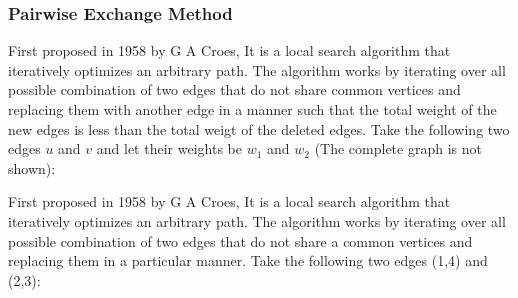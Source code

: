 \documentclass[11pt]{article}
\begin{document}
    \subsubsection {Pairwise Exchange Method}

     First proposed in 1958 by G A Croes, It is a local search algorithm that iteratively optimizes an arbitrary path. The algorithm works by iterating over all possible combination of two edges that do not share common vertices and replacing them with another edge in a manner such that the total weight of the new edges is less than the total weigt of the deleted edges.
    Take the following two edges $u$ and $v$ and let their weights be $w_{1}$ and $w_{2}$ (The complete graph is not shown):
  \begin{center}
    \end{center}

    First proposed in 1958 by G A Croes, It is a local search algorithm that iteratively optimizes an arbitrary path. The algorithm works by iterating over all possible combination of two edges that do not share a common vertices and replacing them in a particular manner.
    Take the following two edges (1,4) and (2,3):
  \begin{center}
  \end{center}
\end{document}
